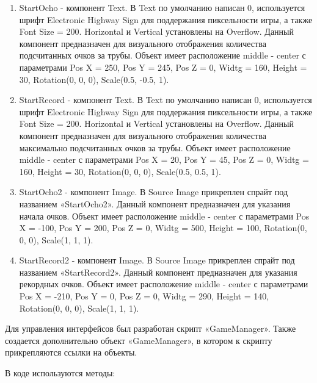 \documentclass[14pt, oneside]{altsu-report}
\begin{document}
\begin{enumerate}
\item StartOcho - компонент Text. В Text по умолчанию написан 0, используется шрифт Electronic Highway Sign для поддержания пиксельности игры, а также Font Size = 200. Horizontal и Vertical установлены на Overflow. Данный компонент предназначен для визуального отображения количества подсчитанных очков за трубы. Объект имеет расположение middle - center с параметрами Pos X = 250, Pos Y = 245, Pos Z = 0, Widtg = 160, Height = 30, Rotation(0, 0, 0), Scale(0.5, -0.5, 1).
\item StartRecord - компонент Text. В Text по умолчанию написан 0, используется шрифт Electronic Highway Sign для поддержания пиксельности игры, а также Font Size = 200. Horizontal и Vertical установлены на Overflow. Данный компонент предназначен для визуального отображения количества максимально подсчитанных очков за трубы. Объект имеет расположение middle - center с параметрами Pos X = 20, Pos Y = 45, Pos Z = 0, Widtg = 160, Height = 30, Rotation(0, 0, 0), Scale(0.5, 0.5, 1).
\item StartOcho2 - компонент Image. В Source Image прикреплен спрайт под названием «StartOcho2». Данный компонент предназначен для указания начала очков. Объект имеет расположение middle - center с параметрами Pos X = -100, Pos Y = 200, Pos Z = 0, Widtg = 500, Height = 100, Rotation(0, 0, 0), Scale(1, 1, 1). 
\item StartRecord2 - компонент Image. В Source Image прикреплен спрайт под названием «StartRecord2». Данный компонент предназначен для указания рекордных очков. Объект имеет расположение middle - center с параметрами Pos X = -210, Pos Y = 0, Pos Z = 0, Widtg = 290, Height = 140, Rotation(0, 0, 0), Scale(1, 1, 1). 

\end{enumerate} 

Для управления интерфейсов был разработан скрипт «GameManager». Также создается дополнительно объект «GameManager», в котором к скрипту прикрепляются ссылки на объекты. 

В коде используются методы:
\end{document}
